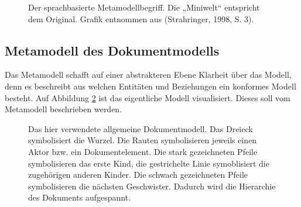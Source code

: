  
\begin{figure}[h!]
\centering
\advance\leftskip-2.5cm
\caption[Der sprachbasierte Metamodellbegriff]{ Der sprachbasierte Metamodellbegriff. Die „Miniwelt“ entspricht dem Original. Grafik entnommen aus (Strahringer, 1998, S. 3). }\label{metamodellbegriff}
\end{figure}
 
\subsection{Metamodell des Dokumentmodells}\label{metamodell_dokument}
 
Das Metamodell schafft auf einer abstrakteren Ebene Klarheit über das Modell, denn es beschreibt aus welchen Entitäten und Beziehungen ein konformes Modell besteht. Auf Abbildung \ref{docmodell} ist das eigentliche Modell visualisiert. Dieses soll vom Metamodell beschrieben werden.

 
\begin{figure}[h!]
\centering
\advance\leftskip-2.5cm
\caption[Allgemeines Dokumentmodell]{ Das hier verwendete allgemeine Dokumentmodell. Das Dreieck symbolisiert die Wurzel. Die Rauten symbolisieren jeweils einen Aktor bzw. ein Dokumentelement. Die stark gezeichneten Pfeile symbolisieren das erste Kind, die gestrichelte Linie symoblisiert die zugehörigen anderen Kinder. Die schwach gezeichneten Pfeile symbolisieren die nächsten Geschwister. Dadurch wird die Hierarchie des Dokuments aufgespannt. }\label{docmodell}
\end{figure}
 
